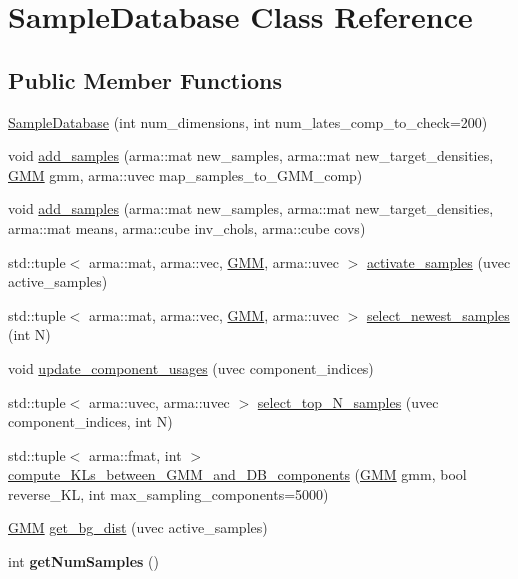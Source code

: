 \hypertarget{classSampleDatabase}{}\section{Sample\+Database Class Reference}
\label{classSampleDatabase}
\subsection*{Public Member Functions}
\begin{DoxyCompactItemize}
\item 
\hyperlink{classSampleDatabase_a92a9faa8a5c447708c1c4dda6ea2323a}{Sample\+Database} (int num\+\_\+dimensions, int num\+\_\+lates\+\_\+comp\+\_\+to\+\_\+check=200)
\item 
void \hyperlink{classSampleDatabase_a0c83808dd741f3ea9018856ad54a44fa}{add\+\_\+samples} (arma\+::mat new\+\_\+samples, arma\+::mat new\+\_\+target\+\_\+densities, \hyperlink{classGMM}{G\+MM} gmm, arma\+::uvec map\+\_\+samples\+\_\+to\+\_\+\+G\+M\+M\+\_\+comp)
\item 
void \hyperlink{classSampleDatabase_aca5e710e5acc96b405fdf8ff40ab5320}{add\+\_\+samples} (arma\+::mat new\+\_\+samples, arma\+::mat new\+\_\+target\+\_\+densities, arma\+::mat means, arma\+::cube inv\+\_\+chols, arma\+::cube covs)
\item 
std\+::tuple$<$ arma\+::mat, arma\+::vec, \hyperlink{classGMM}{G\+MM}, arma\+::uvec $>$ \hyperlink{classSampleDatabase_af24089703aa5c0f8ff54e97cba9a589a}{activate\+\_\+samples} (uvec active\+\_\+samples)
\item 
std\+::tuple$<$ arma\+::mat, arma\+::vec, \hyperlink{classGMM}{G\+MM}, arma\+::uvec $>$ \hyperlink{classSampleDatabase_af24f4ab493dae5d10f0755c7118b3a12}{select\+\_\+newest\+\_\+samples} (int N)
\item 
void \hyperlink{classSampleDatabase_a1fed863851888d772c34c7b004339ebb}{update\+\_\+component\+\_\+usages} (uvec component\+\_\+indices)
\item 
std\+::tuple$<$ arma\+::uvec, arma\+::uvec $>$ \hyperlink{classSampleDatabase_abe4868c9ead9509438329db4a360c643}{select\+\_\+top\+\_\+\+N\+\_\+samples} (uvec component\+\_\+indices, int N)
\item 
std\+::tuple$<$ arma\+::fmat, int $>$ \hyperlink{classSampleDatabase_a13e18ef0d699d8a8c3c666bea9d8c8e8}{compute\+\_\+\+K\+Ls\+\_\+between\+\_\+\+G\+M\+M\+\_\+and\+\_\+\+D\+B\+\_\+components} (\hyperlink{classGMM}{G\+MM} gmm, bool reverse\+\_\+\+KL, int max\+\_\+sampling\+\_\+components=5000)
\item 
\hyperlink{classGMM}{G\+MM} \hyperlink{classSampleDatabase_ab997776649b126365e25335782c1fa44}{get\+\_\+bg\+\_\+dist} (uvec active\+\_\+samples)
\item 
int {\bfseries get\+Num\+Samples} ()\hypertarget{classSampleDatabase_acc174c6265412a0fa14fc70e99ac5826}{}\label{classSampleDatabase_acc174c6265412a0fa14fc70e99ac5826}


\end{DoxyCompactItemize}
